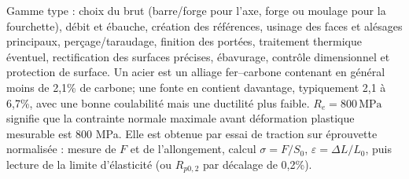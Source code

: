 \begin{corrigebox}
Gamme type : choix du brut (barre/forge pour l'axe, forge ou moulage pour
            la fourchette), débit et ébauche, création des références, usinage des faces et
            alésages principaux, perçage/taraudage, finition des portées, traitement
            thermique éventuel, rectification des surfaces précises, ébavurage, contrôle
            dimensionnel et protection de surface.
Un acier est un alliage fer--carbone contenant en général moins de
            2,1\% de carbone; une fonte en contient davantage, typiquement 2,1 à 6,7\%,
            avec une bonne coulabilité mais une ductilité plus faible.
$R_e=800\,\mathrm{MPa}$ signifie que la contrainte normale maximale avant
            déformation plastique mesurable est 800 MPa. Elle est obtenue par essai de
            traction sur éprouvette normalisée : mesure de $F$ et de l'allongement,
            calcul $\sigma=F/S_0$, $\varepsilon=\Delta L/L_0$, puis lecture de la limite
            d'élasticité (ou $R_{p0,2}$ par décalage de 0,2\%).
\end{corrigebox}
